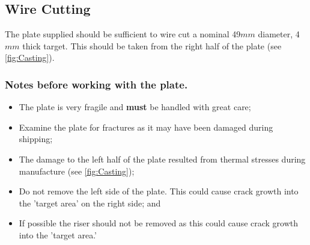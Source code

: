 \subsection{Wire Cutting}
The plate supplied should be sufficient to wire cut a nominal 49$mm$ diameter, 4$mm$ thick target. This should be taken from the right half of the plate (see \ref{fig:Casting}). 

\subsubsection{Notes before working with the plate.}
\begin{itemize}
\item The plate is very fragile and \textbf{must} be handled with great care; 
\item Examine the plate for fractures as it may have been damaged during shipping; 
\item The damage to the left half of the plate resulted from thermal stresses during manufacture (see \ref{fig:Casting});
\item Do not remove the left side of the plate. This could cause crack growth into the 'target area' on the right side; and
\item If possible the riser should not be removed as this could cause crack growth into the 'target area.'
\end{itemize}